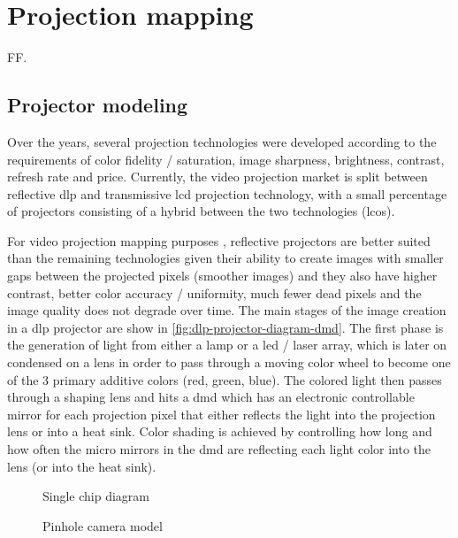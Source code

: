 \section{Projection mapping}

FF.


\subsection{Projector modeling}

Over the years, several projection technologies were developed according to the requirements of color fidelity / saturation, image sharpness, brightness, contrast, refresh rate and price. Currently, the video projection market is split between reflective \gls{dlp} and transmissive \gls{lcd} projection technology, with a small percentage of projectors consisting of a hybrid between the two technologies (\gls{lcos}).

For video projection mapping purposes \cite{Raskar1998,Bimber2005,Tan2013,Fujimoto2014}, reflective projectors are better suited than the remaining technologies given their ability to create images with smaller gaps between the projected pixels (smoother images) and they also have higher contrast, better color accuracy / uniformity, much fewer dead pixels and the image quality does not degrade over time. The main stages of the image creation in a \gls{dlp} projector are show in \cref{fig:dlp-projector-diagram-dmd}. The first phase is the generation of light from either a lamp or a \gls{led} / laser array, which is later on condensed on a lens in order to pass through a moving color wheel to become one of the 3 primary additive colors (red, green, blue). The colored light then passes through a shaping lens and hits a \gls{dmd} which has an electronic controllable mirror for each projection pixel that either reflects the light into the projection lens or into a heat sink. Color shading is achieved by controlling how long and how often the micro mirrors in the \gls{dmd} are reflecting each light color into the lens (or into the heat sink).


\begin{figure}[H]
	\begin{floatrow}[2]
		{\caption[Single chip  diagram]{Single chip  diagram\protect\footnotemark}\label{fig:dlp-projector-diagram-dmd}}
		{\caption[Pinhole camera model]{Pinhole camera model\protect\footnotemark}\label{fig:camera-intrinsics}}
	\end{floatrow}
\end{figure}


